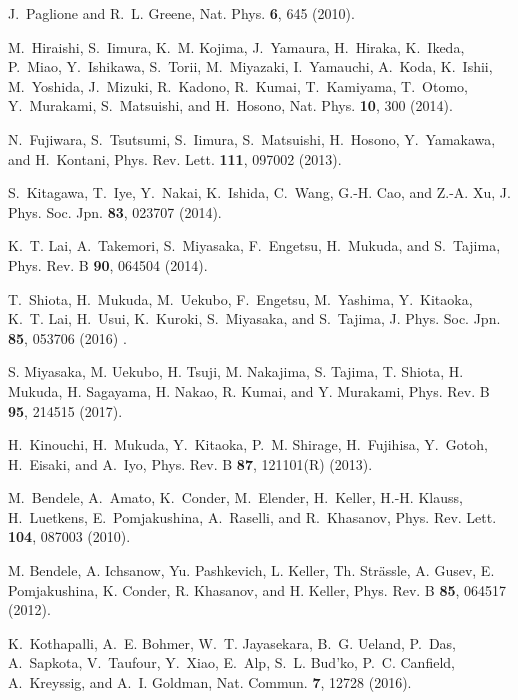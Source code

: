\documentclass [letter,twocolumn]{jpsj3}
\begin{document}
\begin{thebibliography}{10}

J.~Paglione and R.~L. Greene, Nat. Phys. {\bfseries 6}, 645 (2010).

M.~Hiraishi, S.~Iimura, K.~M. Kojima, J.~Yamaura, H.~Hiraka, K.~Ikeda, P.~Miao, Y.~Ishikawa, S.~Torii, M.~Miyazaki, I.~Yamauchi, A.~Koda, K.~Ishii, M.~Yoshida, J.~Mizuki, R.~Kadono, R.~Kumai, T.~Kamiyama, T.~Otomo, Y.~Murakami, S.~Matsuishi, and H.~Hosono, 
Nat. Phys. {\bfseries 10}, 300 (2014).

N.~Fujiwara, S.~Tsutsumi, S.~Iimura, S.~Matsuishi, H.~Hosono, Y.~Yamakawa, and H.~Kontani, 
Phys. Rev. Lett. {\bfseries 111}, 097002 (2013).

S.~Kitagawa, T.~Iye, Y.~Nakai, K.~Ishida, C.~Wang, G.-H. Cao, and Z.-A. Xu, 
J. Phys. Soc. Jpn. {\bfseries 83}, 023707 (2014).

K.~T. Lai, A.~Takemori, S.~Miyasaka, F.~Engetsu, H.~Mukuda, and S.~Tajima, 
Phys. Rev. B {\bfseries 90}, 064504 (2014).

T.~Shiota, H.~Mukuda, M.~Uekubo, F.~Engetsu, M.~Yashima, Y.~Kitaoka, K.~T. Lai, H.~Usui, K.~Kuroki, S.~Miyasaka, and S.~Tajima, 
J. Phys. Soc. Jpn. {\bfseries 85}, 053706 (2016) .

S. Miyasaka, M. Uekubo, H. Tsuji, M. Nakajima, S. Tajima, T. Shiota, H. Mukuda, H. Sagayama, H. Nakao, R. Kumai, and Y. Murakami, 
Phys. Rev. B {\bfseries 95}, 214515 (2017).

H.~Kinouchi, H.~Mukuda, Y.~Kitaoka, P.~M. Shirage, H.~Fujihisa, Y.~Gotoh, H.~Eisaki, and A.~Iyo, 
Phys. Rev. B {\bfseries 87}, 121101(R) (2013).

M.~Bendele, A.~Amato, K.~Conder, M.~Elender, H.~Keller, H.-H. Klauss, H.~Luetkens, E.~Pomjakushina, A.~Raselli, and R.~Khasanov, 
Phys. Rev. Lett. {\bfseries 104}, 087003 (2010).

M. Bendele, A. Ichsanow, Yu. Pashkevich, L. Keller, Th. Str\"assle, A. Gusev, E. Pomjakushina, K. Conder, R. Khasanov, and H. Keller, 
Phys. Rev. B {\bfseries 85}, 064517 (2012). 

K.~Kothapalli, A.~E. Bohmer, W.~T. Jayasekara, B.~G. Ueland, P.~Das, A.~Sapkota, V.~Taufour, Y.~Xiao, E.~Alp, S.~L. Bud'ko, P.~C. Canfield, A.~Kreyssig, and A.~I. Goldman, 
Nat. Commun. {\bfseries 7}, 12728 (2016).


\end{thebibliography}
\end{document}
